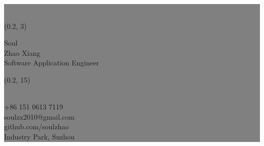 \documentclass[a4paper,landscape]{article}
\makeatletter
\newcounter{colorCounter}
\def\@sectioncolor#1#2#3{%
  {%
    \color{%
      \ifcase\value{colorCounter}%
        blue\or%
        red\or%
        orange\or%
        green\or%
        purple\or%
        brown\else%
        headercolor\fi%
    } #1#2#3%
  }%
  \stepcounter{colorCounter}%
}
\renewcommand{\section}[1]{
  \par\vspace{\baselineskip}
  {%
    \LARGE\headingfont\color{headercolor}%
    \@sectioncolor #1%
  }
  \par\vspace{\baselineskip}
}
\makeatother
\begin{document}
\setlength{\fboxsep}{0pt}
 \colorbox{gray}{
  \begin{minipage}[t][\paperheight]{0.2\paperwidth}
    \begin{flushright}
        \fontsize{40pt}{72pt}\color{gray}{\_\_\_}%
      \\
        \begin{textblock}{5.5}(0.2, 3)
        \begin{flushright}
            \fontsize{40pt}{72pt}\color{white}%
              {\bodyfont Soul}
             \vspace{0.3cm}\\
             \fontsize{14pt}{24pt}\color{white}%
              {\thinfont Zhao Xiang}
              \vspace{0.3cm}\\
             \fontsize{10pt}{12pt}\color{white}%
              {\thinfont Software Application Engineer}%
         \end{flushright}
        \end{textblock}

        \begin{textblock}{5.5}(0.2, 15)
        \begin{flushright}
            \let\oldsection\section
            \renewcommand{\section}[1]{
                    \par\vspace{\baselineskip}{\Large\headingfont\color{white} \hfill#1}
            }
            
            \section{Contact}
            \\
            {\fontsize{10pt}{12pt}\color{white}+86 151 0613 7119}
		        \\
            {\fontsize{10pt}{12pt}\color{white}soulzx2010@gmail.com}
            \\
            {\fontsize{10pt}{12pt}\color{white}github.com/soulzhao}
            \\            
            {\fontsize{10pt}{12pt}\color{white}Industry Park, Suzhou}
		  ~
            \let\section\oldsection
         \end{flushright}
        \end{textblock}
    \end{flushright}
\end{minipage}%
}
\end{document}
